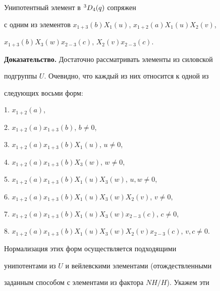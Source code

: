  


\begin{lem} 


Унипотентный элемент в ${}^3D_4(q)$ сопряжен 


с одним из элементов $x_{1+3}(b)X_1(u)$, $x_{1+2}(a)X_1(u)X_2(v)$, 


$x_{1+3}(b)X_3(w)x_{2-3}(c)$, $X_2(v)x_{2-3}(c)$. 


\end{lem} 


 


{\bf Доказательство.} Достаточно рассматривать элементы из силовской 


подгруппы $U$. Очевидно, что каждый из них относится к одной из  


следующих восьми форм: 


 


1. $x_{1+2}(a)$, 


 


2. $x_{1+2}(a)x_{1+3}(b)$, $b\ne 0$, 


 


3. $x_{1+2}(a)x_{1+3}(b)X_1(u)$, $u\ne0$, 


 


4. $x_{1+2}(a)x_{1+3}(b)X_3(w)$, $w\ne0$, 


 


5. $x_{1+2}(a)x_{1+3}(b)X_1(u)X_3(w)$, $u,w\ne0$, 


 


6. $x_{1+2}(a)x_{1+3}(b)X_1(u)X_3(w)X_2(v)$, $v\ne0$, 


 


7. $x_{1+2}(a)x_{1+3}(b)X_1(u)X_3(w)x_{2-3}(c)$, $c\ne0$, 


 


8. $x_{1+2}(a)x_{1+3}(b)X_1(u)X_3(w)X_2(v)x_{2-3}(c)$, $v,c\ne0$. 


 


Нормализация этих форм осуществляется подходящими 


унипотентами из $U$ и вейлевскими элементами (отождествленными  


заданным способом с элементами из фактора $NH/H$). Укажем эти 


